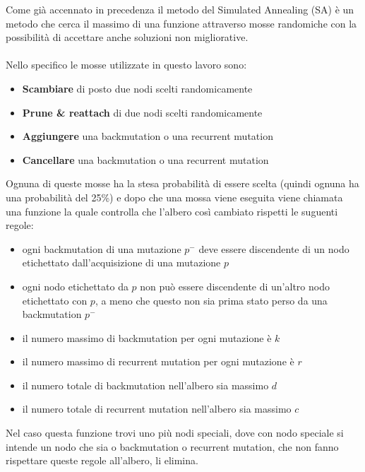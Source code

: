 \documentclass[12pt]{report}
\begin{document}
  Come già accennato in precedenza il metodo del Simulated Annealing (SA) è un metodo che cerca il massimo di una funzione attraverso mosse randomiche con la possibilità di accettare anche soluzioni non migliorative.\\\\
  Nello specifico le mosse utilizzate in questo lavoro sono:
  \begin{itemize}
    \item \textbf{Scambiare} di posto due nodi scelti randomicamente

    \item \textbf{Prune \& reattach} di due nodi scelti randomicamente

    \item \textbf{Aggiungere} una backmutation o una recurrent mutation

    \item \textbf{Cancellare} una backmutation o una recurrent mutation
  \end{itemize}
  Ognuna di queste mosse ha la stesa probabilità di essere scelta (quindi ognuna ha una probabilità del 25\%) e dopo che una mossa viene eseguita viene chiamata una funzione la quale controlla che l'albero così cambiato rispetti le suguenti regole:
  \begin{itemize}
    \item ogni backmutation di una mutazione $p^-$ deve essere discendente di un nodo etichettato dall'acquisizione di una mutazione $p$

    \item ogni nodo etichettato da $p$ non può essere discendente di un'altro nodo etichettato con $p$, a meno che questo non sia prima stato perso da una backmutation $p^-$

    \item il numero massimo di backmutation per ogni mutazione è $k$

    \item il numero massimo di recurrent mutation per ogni mutazione è $r$

    \item il numero totale di backmutation nell'albero sia massimo $d$

    \item il numero totale di recurrent mutation nell'albero sia massimo $c$
  \end{itemize}
  Nel caso questa funzione trovi uno più nodi speciali, dove con nodo speciale si intende un nodo che sia o backmutation o recurrent mutation, che non fanno rispettare queste regole all'albero, li elimina.\\\\
\end{document}
